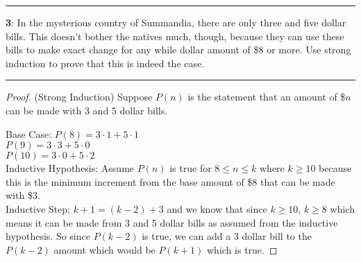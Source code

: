 \documentclass[11pt]{article}
\newcommand\question[2]{\vspace{.25in}\hrule\textbf{#1}: #2\vspace{.5em}\hrule\vspace{.10in}}
\begin{document}
\question{3}{In the mysterious country of Summandia, there are only three and five dollar bills. This doesn't bother the natives much, though, because they can use these bills to make exact change for any while dollar amount of \$8 or more. Use strong induction to prove that this is indeed the case.}

\begin{proof}
	(Strong Induction) Suppose $P(n)$ is the statement that an amount of \$$n$ can be made with 3 and 5 dollar bills.

	Base Case: $P(8) = 3 \cdot 1 + 5 \cdot 1$\\
	$P(9) = 3 \cdot 3 + 5 \cdot 0$\\
	$P(10) = 3 \cdot 0 + 5 \cdot 2$\\
	Inductive Hypothesis: Assume $P(n)$ is true for $8 \le n \le k$ where $k \ge 10$ because this is the minimum increment from the base amount of \$8 that can be made with \$3.\\
	Inductive Step: $k+1 = (k-2)+3$ and we know that since $k \ge 10$, $k \ge 8$ which means it can be made from 3 and 5 dollar bills as assumed from the inductive hypothesis. So since $P(k-2)$ is true, we can add a 3 dollar bill to the $P(k-2)$ amount which would be $P(k+1)$ which is true.
\end{proof}



	
\end{document}
